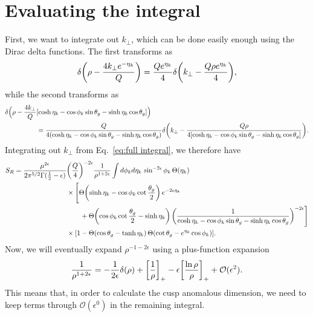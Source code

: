 \documentclass[11pt,twoside,reqno]{amsart}
\theoremstyle{plain}
\theoremstyle{remark}
\theoremstyle{definition}
\theoremstyle{remark}
\theoremstyle{definition}
\theoremstyle{definition}
\newcommand{\cO}{\mathcal{O}}
\begin{document}
\section{Evaluating the integral}
	First, we want to integrate out $k_\perp$, which can be done easily enough using the Dirac delta functions. The first transforms as
	\begin{equation}
		\delta\qty(\rho - \frac{4k_\perp e^{-\eta_k}}{Q}) = \frac{Q e^{\eta_k}}{4} \delta\qty(k_\perp - \frac{Q \rho e^{\eta_k}}{4}),
	\end{equation}
	while the second transforms as
	\begin{equation}
	\begin{aligned}
		\delta\Big(\rho - \frac{4 k_\perp}{Q}&\qty[\cosh\eta_k - \cos\phi_k\sin\theta_g - \sinh\eta_k\cos\theta_g]\Big) \\
		&= \frac{Q}{4\qty(\cosh\eta_k - \cos\phi_k\sin\theta_g - \sinh\eta_k\cos\theta_g)} \delta\qty(k_\perp - \frac{Q \rho}{4\qty[\cosh\eta_k - \cos\phi_k\sin\theta_g - \sinh\eta_k\cos\theta_g]}).
	\end{aligned}
	\end{equation}
	Integrating out $k_\perp$ from Eq.~\ref{eq:full integral}, we therefore have
	\begin{equation}\label{eq:full integral without kperp}
	\begin{aligned}
		S_R = \frac{\mu^{2\epsilon}}{2\pi^{5/2} \Gamma(\frac{1}{2} - \epsilon)} &\qty(\frac{Q}{4})^{-2\epsilon} \frac{1}{\rho^{1+2\epsilon}} \int d\phi_k d\eta_k\, \sin^{-2\epsilon}\phi_k \, \Theta(\eta_k) \\
		&\times \Bigg[ \Theta\qty(\sinh\eta_k - \cos\phi_k\cot\frac{\theta_g}{2})\,e^{-2\epsilon\eta_k} \\
			&\qquad+ \Theta\qty(\cos\phi_k\cot\frac{\theta_g}{2} - \sinh\eta_k)\, \qty(\frac{1}{\cosh\eta_k - \cos\phi_k\sin\theta_g - \sinh\eta_k\cos\theta_g})^{-2\epsilon}\Bigg] \\
			&\times \qty[1 - \Theta(\cos\theta_g - \tanh\eta_k)\,\Theta\qty(\cot\theta_g - e^{\eta_k}\cos\phi_k)].
	\end{aligned}
	\end{equation}
	Now, we will eventually expand $\rho^{-1-2\epsilon}$ using a plus-function expansion \cite{lazopoulos_qcd_2007}
	\begin{equation}
		\frac{1}{\rho^{1+2\epsilon}} = -\frac{1}{2\epsilon}\delta(\rho) + \qty[\frac{1}{\rho}]_+ - \epsilon \qty[\frac{\ln \rho}{\rho}]_+ + \cO(\epsilon^2).
	\end{equation}
	This means that, in order to calculate the cusp anomalous dimension, we need to keep terms through $\cO(\epsilon^0)$ in the remaining integral.
\end{document}
